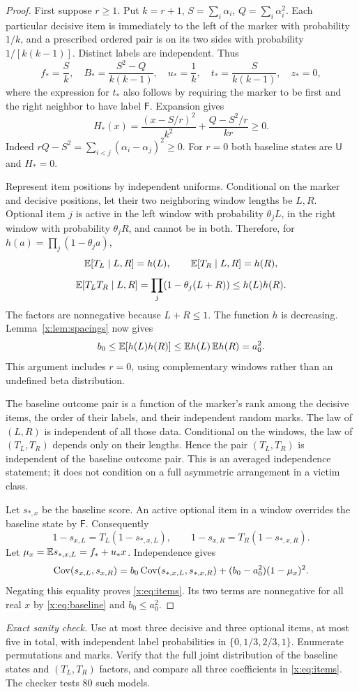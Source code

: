 \documentclass[11pt,a4paper]{article}
\theoremstyle{definition}\newtheorem{definition}[theorem]{Definition}
\theoremstyle{remark}\newtheorem{remark}[theorem]{Remark}
\theoremstyle{definition}\newtheorem{xexample}[xtheorem]{Example}\theoremstyle{plain}
\newcommand{\Fail}{\mathsf F}\newcommand{\Clean}{\mathsf C}\newcommand{\Und}{\mathsf U}
\newcommand{\xcheck}[1]{\par\smallskip\textit{Exact sanity check.} #1\par}
\begin{document}
\begin{proof}
First suppose $r\ge1$. Put $k=r+1$, $S=\sum_i\alpha_i$, $Q=\sum_i\alpha_i^2$. Each particular decisive item is immediately to the left of the marker with probability $1/k$, and a prescribed ordered pair is on its two sides with probability $1/[k(k-1)]$. Distinct labels are independent. Thus
\[
f_*=\frac S k,\quad B_*=\frac{S^2-Q}{k(k-1)},\quad
u_*=\frac1k,\quad t_*=\frac{S}{k(k-1)},\quad z_*=0,
\]
where the expression for $t_*$ also follows by requiring the marker to be first and the right neighbor to have label $\Fail$. Expansion gives
\begin{equation}\label{x:eq:baseline}
H_*(x)=\frac{(x-S/r)^2}{k^2}+\frac{Q-S^2/r}{kr}\ge0.
\end{equation}
Indeed $rQ-S^2=\sum_{i<j}(\alpha_i-\alpha_j)^2\ge0$. For $r=0$ both baseline states are $\Und$ and $H_*=0$.

Represent item positions by independent uniforms. Conditional on the marker and decisive positions, let their two neighboring window lengths be $L,R$. Optional item $j$ is active in the left window with probability $\theta_jL$, in the right window with probability $\theta_jR$, and cannot be in both. Therefore, for $h(a)=\prod_j(1-\theta_j a)$,
\[
\mathbb E[T_L\mid L,R]=h(L),\qquad
\mathbb E[T_R\mid L,R]=h(R),
\]
\[
\mathbb E[T_LT_R\mid L,R]=\prod_j(1-\theta_j(L+R))
\le h(L)h(R).
\]
The factors are nonnegative because $L+R\le1$. The function $h$ is decreasing. Lemma~\ref{x:lem:spacings} now gives
\[
b_0\le\mathbb E[h(L)h(R)]\le\mathbb E h(L)\,\mathbb E h(R)=a_0^2.
\]
This argument includes $r=0$, using complementary windows rather than an undefined beta distribution.

The baseline outcome pair is a function of the marker's rank among the decisive items, the order of their labels, and their independent random marks. The law of $(L,R)$ is independent of all those data. Conditional on the windows, the law of $(T_L,T_R)$ depends only on their lengths. Hence the pair $(T_L,T_R)$ is independent of the baseline outcome pair. This is an averaged independence statement; it does not condition on a full asymmetric arrangement in a victim class.

Let $s_{*,x}$ be the baseline score. An active optional item in a window overrides the baseline state by $\Fail$. Consequently
\[
1-s_{x,L}=T_L(1-s_{*,x,L}),\qquad
1-s_{x,R}=T_R(1-s_{*,x,R}).
\]
Let $\mu_x=\mathbb E s_{*,x,L}=f_*+u_*x$. Independence gives
\[
\operatorname{Cov}(s_{x,L},s_{x,R})
=b_0\operatorname{Cov}(s_{*,x,L},s_{*,x,R})+(b_0-a_0^2)(1-\mu_x)^2.
\]
Negating this equality proves \eqref{x:eq:items}. Its two terms are nonnegative for all real $x$ by \eqref{x:eq:baseline} and $b_0\le a_0^2$.
\end{proof}
\xcheck{Use at most three decisive and three optional items, at most five in total, with independent label probabilities in $\{0,1/3,2/3,1\}$. Enumerate permutations and marks. Verify that the full joint distribution of the baseline states and $(T_L,T_R)$ factors, and compare all three coefficients in \eqref{x:eq:items}. The checker tests 80 such models.}
\end{document}
